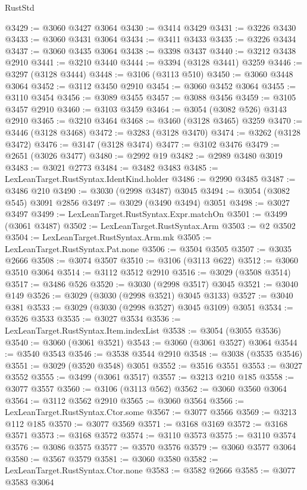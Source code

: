 \begin{lexlean}{RustStd}
\begin{coremodule}
@3429 := @3060 @3427 @3064
@3430 := @3414 @3429
@3431 := @3226 @3430
@3433 := @3060 @3431 @3064
@3434 := @3411 @3433
@3435 := @3226 @3434
@3437 := @3060 @3435 @3064
@3438 := @3398 @3437
@3440 := @3212 @3438 @2910
@3441 := @3210 @3440
@3444 := @3394 (@3128 @3441) @3259
@3446 := @3297 (@3128 @3444)
@3448 := @3106 (@3113 @510)
@3450 := @3060 @3448 @3064
@3452 := @3112 @3450 @2910
@3454 := @3060 @3452 @3064
@3455 := @3110 @3454
@3456 := @3089 @3455
@3457 := @3088 @3456
@3459 := @3105 @3457 @2910
@3460 := @3103 @3459
@3464 := @3054 (@3082 @526) @3143 @2910
@3465 := @3210 @3464
@3468 := @3460 (@3128 @3465) @3259
@3470 := @3446 (@3128 @3468)
@3472 := @3283 (@3128 @3470)
@3474 := @3262 (@3128 @3472)
@3476 := @3147 (@3128 @3474)
@3477 := @3102 @3476
@3479 := @2651 (@3026 @3477)
@3480 := @2992 @19
@3482 := @2989 @3480 @3019
@3483 := @3021 @2773
@3484 := @3482 @3483
@3485 := LexLeanTarget.RustSyntax.IdentKind.holder
@3486 := @2990 @3485
@3487 := @3486 @210
@3490 := @3030 (@2998 @3487) @3045
@3494 := @3054 (@3082 @545) @3091 @2856
@3497 := @3029 (@3490 @3494) @3051
@3498 := @3027 @3497
@3499 := LexLeanTarget.RustSyntax.Expr.matchOn
@3501 := @3499 (@3061 @3487)
@3502 := LexLeanTarget.RustSyntax.Arm
@3503 := @2 @3502
@3504 := LexLeanTarget.RustSyntax.Arm.mk
@3505 := LexLeanTarget.RustSyntax.Pat.none
@3506 := @3504 @3505
@3507 := @3035 @2666
@3508 := @3074 @3507
@3510 := @3106 (@3113 @622)
@3512 := @3060 @3510 @3064
@3514 := @3112 @3512 @2910
@3516 := @3029 (@3508 @3514)
@3517 := @3486 @526
@3520 := @3030 (@2998 @3517) @3045
@3521 := @3040 @149
@3526 := @3029 (@3030 (@2998 @3521) @3045 @3133)
@3527 := @3040 @381
@3533 := @3029 (@3030 (@2998 @3527) @3045 @3109) @3051
@3534 := @3526 @3533
@3535 := @3027 @3534
@3536 := LexLeanTarget.RustSyntax.Item.indexList
@3538 := @3054 (@3055 @3536)
@3540 := @3060 (@3061 @3521)
@3543 := @3060 (@3061 @3527) @3064
@3544 := @3540 @3543
@3546 := @3538 @3544 @2910
@3548 := @3038 (@3535 @3546)
@3551 := @3029 (@3520 @3548) @3051
@3552 := @3516 @3551
@3553 := @3027 @3552
@3555 := @3499 (@3061 @3517)
@3557 := @3213 @210 @185
@3558 := @3077 @3557
@3560 := @3106 (@3113 @562)
@3562 := @3060 @3560 @3064
@3564 := @3112 @3562 @2910
@3565 := @3060 @3564
@3566 := LexLeanTarget.RustSyntax.Ctor.some
@3567 := @3077 @3566
@3569 := @3213 @112 @185
@3570 := @3077 @3569
@3571 := @3168 @3169
@3572 := @3168 @3571
@3573 := @3168 @3572
@3574 := @3110 @3573
@3575 := @3110 @3574
@3576 := @3086 @3575
@3577 := @3570 @3576
@3579 := @3060 @3577 @3064
@3580 := @3567 @3579
@3581 := @3060 @3580
@3582 := LexLeanTarget.RustSyntax.Ctor.none
@3583 := @3582 @2666
@3585 := @3077 @3583 @3064

\end{coremodule}
\end{lexlean}
